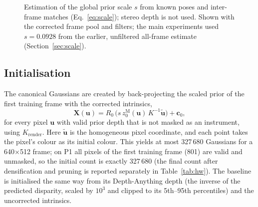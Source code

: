 \documentclass[conference]{IEEEtran}
\begin{document}
\begin{figure}[t]
\centering
{}
\caption{Estimation of the global prior scale $s$ from known poses and inter-frame matches (Eq.~\ref{eq:scale}); stereo depth is not used. Shown with the corrected frame pool and filters; the main experiments used $s{=}0.0928$ from the earlier, unfiltered all-frame estimate (Section~\ref{sec:scale}).}
\label{fig:scale}
\end{figure}

\subsection{Initialisation}
The canonical Gaussians are created by back-projecting the scaled prior of the first training frame with the corrected intrinsics,
\begin{equation}
\mathbf{X}(\mathbf{u})=R_0\,\big(s\,z^{\mathrm{M}}_0(\mathbf{u})\,K^{-1}\tilde{\mathbf{u}}\big)+\mathbf{c}_0 ,
\end{equation}
for every pixel $\mathbf{u}$ with valid prior depth that is not masked as an instrument, using $K_{\mathrm{render}}$. Here $\tilde{\mathbf{u}}$ is the homogeneous pixel coordinate, and each point takes the pixel's colour as its initial colour. This yields at most 327\,680 Gaussians for a 640$\times$512 frame; on P1 all pixels of the first training frame (801) are valid and unmasked, so the initial count is exactly 327\,680 (the final count after densification and pruning is reported separately in Table~\ref{tab:hw}). The baseline is initialised the same way from its Depth-Anything depth (the inverse of the predicted disparity, scaled by $10^3$ and clipped to its 5th--95th percentiles) and the uncorrected intrinsics.
\end{document}
